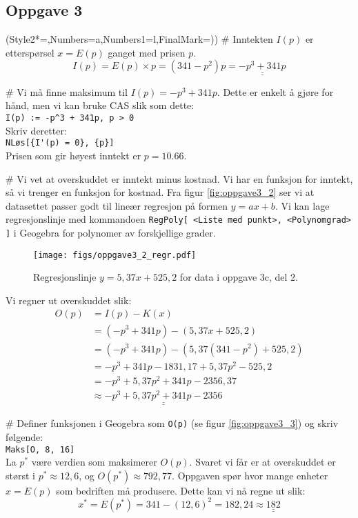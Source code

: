 \documentclass[12pt, a4paper]
{article}						%
\def\answer#1{\underline{\underline{#1}}}
\begin{document}
	\subsection*{Oppgave 3}
	\begin{easylist}[enumerate]
		\ListProperties(Style2*=,Numbers=a,Numbers1=l,FinalMark={)})
		# Inntekten $I(p)$ er etterspørsel $x = E(p)$ ganget med prisen $p$.
		\begin{equation*}
		I(p) = E(p) \times p = \left(341 - p^2\right)p =  \answer{- p^3 + 341p}
		\end{equation*}
		
		# Vi må finne maksimum til $I(p) = - p^3 + 341p$.
		Dette er enkelt å gjøre for hånd, men vi kan bruke CAS slik som dette:\\
		\verb|I(p) := -p^3 + 341p, p > 0|\\
		Skriv deretter: \\
		\verb|NLøs[{I'(p) = 0}, {p}]| \\
		Prisen som gir høyest inntekt er \answer{$p = 10.66$}.
		
		
		# Vi vet at overskuddet er inntekt minus kostnad. Vi har en funksjon for inntekt,
		så vi trenger en funksjon for kostnad. 
		Fra figur \eqref{fig:oppgave3_2} ser vi at datasettet passer godt til lineær regresjon på formen $y = ax + b$. Vi kan lage regresjonslinje med kommandoen \texttt{RegPoly[ <Liste med punkt>, <Polynomgrad> ]} i Geogebra for polynomer av forskjellige grader.
		\begin{figure}[th!]
			\centering
			\texttt{[image: figs/oppgave3\_2\_regr.pdf]}
			\caption{Regresjonslinje $y = 5,37x +525,2$ for data i oppgave 3c, del 2.}
			\label{fig:oppgave3_2}
		\end{figure}
		Vi regner ut overskuddet slik:
		\begin{align*}
		O(p) &= I(p) - K(x) \\
		&= \left(- p^3 + 341p\right) - \left(5,37x +525,2\right) \\
		&= \left(- p^3 + 341p\right) - \left(5,37\left(341-p^2\right) +525,2\right) \\
		&= - p^3 + 341p - 1831,17 + 5,37p^2 - 525,2 \\
		&= - p^3 + 5,37p^2 + 341p - 2356,37 \\
		&\approx \answer{- p^3 + 5,37p^2 + 341p - 2356}
		\end{align*}
		
		# Definer funksjonen i Geogebra som \texttt{O(p)} (se figur \eqref{fig:oppgave3_3}) og skriv følgende:\\
		\texttt{Maks[O, 8, 16]}
		\\
		La $p^*$ være verdien som maksimerer $O(p)$. Svaret vi får er at overskuddet er størst i $p^* \approx 12,6$, og $O(p^*) \approx 792,77$.
		Oppgaven spør hvor mange enheter $x = E(p)$ som bedriften må produsere. Dette kan vi nå regne ut slik:
		\begin{equation*}
		x^* = E(p^*) = 341 - (12,6)^2 = 182,24 \approx \answer{182}
		\end{equation*}
		

\end{easylist}
\end{document}
